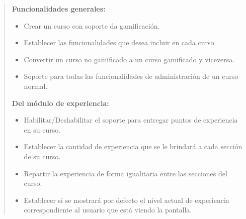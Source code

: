     \begin{quote}
    {\bf Funcionalidades generales:}
        \begin{itemize}
        \item Crear un curso con soporte da gamificación.
        \item Establecer las funcionalidades que desea incluir en cada curso.
        \item Convertir un curso no gamificado a un curso gamificado y viceversa.
        \item Soporte para todas las funcionalidades de administración de un curso
              normal.
        \end{itemize}

    {\bf Del módulo de experiencia:}
        \begin{itemize}
        \item Habilitar/Deshabilitar el soporte para entregar puntos de experiencia
              en su curso.
        \item Establecer la cantidad de experiencia que se le brindará a cada
              sección de su curso.
        \item Repartir la experiencia de forma igualitaria entre las secciones del
              curso.
        \item Establecer si se mostrará por defecto el nivel actual de experiencia
              correspondiente al usuario que está viendo la pantalla.
        \end{itemize}

    \end{quote}



